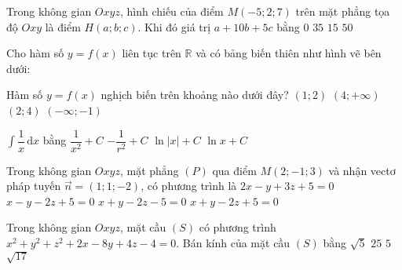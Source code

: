 \begin{ex}%
Trong không gian $O x y z$, hình chiếu của điểm $M(-5; 2; 7)$ trên mặt phẳng tọa độ $O x y$ là điểm $H(a; b; c)$. Khi đó giá trị $a+10 b+5 c$ bằng
\choice
{$0$}
{$35$}
{\True $15$}
{$50$}

\end{ex}
\begin{ex}%
Cho hàm số $y=f(x)$ liên tục trên $\mathbb{R}$ và có bảng biến thiên như hình vẽ bên dưới:
\begin{center}
\end{center}

Hàm số $y=f(x)$ nghịch biến trên khoảng nào dưới đây?
\choice
{\True $(1; 2)$}
{$(4;+\infty)$}
{$(2; 4)$}
{$(-\infty;-1)$}

\end{ex}
\begin{ex}%
$\displaystyle\int \dfrac{1}{x} \mathrm{\,d} x$ bằng
\choice
{$\dfrac{1}{x^2}+C$}
{$-\dfrac{1}{r^2}+C$}
{\True $\ln |x|+C$}
{$\ln x+C$}

\end{ex}
\begin{ex}%
Trong không gian $O x y z$, mặt phẳng $(P)$ qua điểm $M(2;-1; 3)$ và nhận vectơ pháp tuyến $\vec{n}=(1; 1;-2)$, có phương trình là
\choice
{$2 x-y+3 z+5=0$}
{$x-y-2 z+5=0$}
{$x+y-2 z-5=0$}
{\True $x+y-2 z+5=0$}

\end{ex}
\begin{ex}%
Trong không gian $O x y z$, mặt cầu $(S)$ có phương trình $x^2+y^2+ z^2+2 x-8 y+4 z-4=0$. Bán kính của mặt cầu $(S)$ bằng
\choice
{$\sqrt{5}$}
{$25$}
{\True $5$}
{$\sqrt{17}$}

\end{ex}

